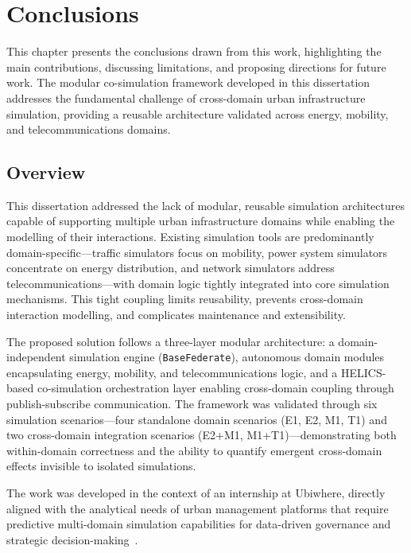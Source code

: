 \chapter{Conclusions}%
\label{chapter:conclusions}

\begin{introduction}
This chapter presents the conclusions drawn from this work, highlighting the main contributions, discussing limitations, and proposing directions for future work. The modular co-simulation framework developed in this dissertation addresses the fundamental challenge of cross-domain urban infrastructure simulation, providing a reusable architecture validated across energy, mobility, and telecommunications domains.
\end{introduction}

\section{Overview}

This dissertation addressed the lack of modular, reusable simulation architectures capable of supporting multiple urban infrastructure domains while enabling the modelling of their interactions. Existing simulation tools are predominantly domain-specific---traffic simulators focus on mobility, power system simulators concentrate on energy distribution, and network simulators address telecommunications---with domain logic tightly integrated into core simulation mechanisms. This tight coupling limits reusability, prevents cross-domain interaction modelling, and complicates maintenance and extensibility.

The proposed solution follows a three-layer modular architecture: a domain-independent simulation engine (\texttt{BaseFederate}), autonomous domain modules encapsulating energy, mobility, and telecommunications logic, and a HELICS-based co-simulation orchestration layer enabling cross-domain coupling through publish-subscribe communication. The framework was validated through six simulation scenarios---four standalone domain scenarios (E1, E2, M1, T1) and two cross-domain integration scenarios (E2+M1, M1+T1)---demonstrating both within-domain correctness and the ability to quantify emergent cross-domain effects invisible to isolated simulations.

The work was developed in the context of an internship at Ubiwhere, directly aligned with the analytical needs of urban management platforms that require predictive multi-domain simulation capabilities for data-driven governance and strategic decision-making~\cite{ubiwhere_urban_platform}.


